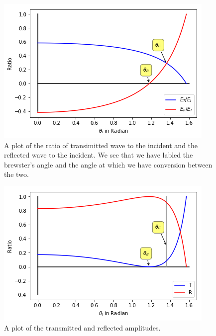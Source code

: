 \documentclass[10pt]{article}
\begin{document}
\begin{figure}
  \centering
  \includegraphics[scale=0.8]{ET_ER_plot.png}
  \caption{A plot of the ratio of transimitted wave to the incident and the reflected wave to the incident. We see that we have labled the brewster's angle and the angle at which we have conversion between the two.}
\end{figure}

\begin{figure}
  \centering
  \includegraphics[scale=0.8]{T_R_plot.png}
  \caption{A plot of the transmitted and reflected amplitudes.}
\end{figure}
\end{document}
